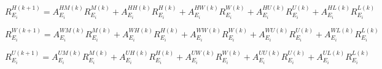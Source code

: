 
\begin{equation}
R_{{E_{i}}}^{H(k+1)} = A_{E_{i}}^{HM(k)}R_{{E_{i}}}^{M(k)} + A_{E_{i}}^{HH(k)}R_{{E_{i}}}^{H(k)} + A_{E_{i}}^{HW(k)}R_{{E_{i}}}^{W(k)}+ A_{E_{i}}^{HU(k)}R_{{E_{i}}}^{U(k)} + A_{E_{i}}^{HL(k)}R_{{E_{i}}}^{L(k)}
\end{equation}




\begin{equation}
R_{{E_{i}}}^{W(k+1)} = A_{E_{i}}^{WM(k)}R_{{E_{i}}}^{M(k)} + A_{E_{i}}^{WH(k)}R_{{E_{i}}}^{H(k)} + A_{E_{i}}^{WW(k)}R_{{E_{i}}}^{W(k)}+ A_{E_{i}}^{WU(k)}R_{{E_{i}}}^{U(k)} + A_{E_{i}}^{WL(k)}R_{{E_{i}}}^{L(k)}
\end{equation}


\begin{equation}
R_{{E_{i}}}^{U(k+1)} = A_{E_{i}}^{UM(k)}R_{{E_{i}}}^{M(k)} + A_{E_{i}}^{UH(k)}R_{{E_{i}}}^{H(k)} + A_{E_{i}}^{UW(k)}R_{{E_{i}}}^{W(k)}+ A_{E_{i}}^{UU(k)}R_{{E_{i}}}^{U(k)} + A_{E_{i}}^{UL(k)}R_{{E_{i}}}^{L(k)}
\end{equation}




